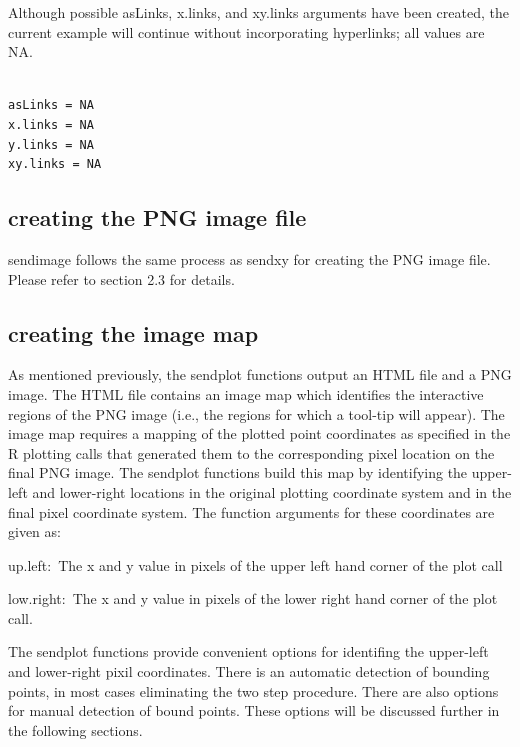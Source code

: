 \documentclass[]{article}
\begin{document}
\indent Although possible asLinks, x.links, and xy.links arguments have been created, the current example will continue without incorporating hyperlinks; all values are NA. 

\begin{verbatim}

asLinks = NA
x.links = NA
y.links = NA
xy.links = NA

\end{verbatim}




\subsection{creating the PNG image file}

\indent sendimage follows the same process as sendxy for creating the PNG image file. Please refer to section 2.3 for details.

\subsection{creating the image map}

As mentioned previously, the sendplot functions output an HTML file and a PNG image. The HTML file contains an image map which identifies the interactive regions of the PNG image (i.e., the regions for which a tool-tip will appear). The image map requires a mapping of the plotted point coordinates as specified in the R plotting calls that generated them to the corresponding pixel location on the final PNG image. The sendplot functions build this map by identifying the upper-left and lower-right locations in the original plotting coordinate system and in the final pixel coordinate system. The function arguments for these coordinates are given as:
\begin{description}
  \item{up.left:~}{The x and y value in pixels of the upper left hand
    corner of the plot call}
  \item{low.right:~}{The x and y value in pixels of the lower right hand
    corner of the plot call.}
\end{description}

\indent The sendplot functions provide convenient options for identifing the upper-left and lower-right pixil coordinates. There is an automatic detection of bounding points, in most cases eliminating the two step procedure. There are also options for manual detection of bound points. These options will be discussed further in the following sections.  
\end{document}
